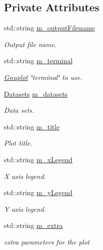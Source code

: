 \subsection*{Private Attributes}
\begin{DoxyCompactItemize}
\item 
std\+::string \hyperlink{classns3_1_1Gnuplot_aa22986d3af73e9b62a6eaadaf1b43763}{m\+\_\+output\+Filename}
\begin{DoxyCompactList}\small\item\em Output file name. \end{DoxyCompactList}\item 
std\+::string \hyperlink{classns3_1_1Gnuplot_a57041922a660f3a33e8f2f5f75ad9b83}{m\+\_\+terminal}
\begin{DoxyCompactList}\small\item\em \hyperlink{classns3_1_1Gnuplot}{Gnuplot} \char`\"{}terminal\char`\"{} to use. \end{DoxyCompactList}\item 
\hyperlink{classns3_1_1Gnuplot_a88609830a70d2fb1f1b8f2e8a70cd09d}{Datasets} \hyperlink{classns3_1_1Gnuplot_a67150d03c8735e79efa247e27ffd2ab5}{m\+\_\+datasets}
\begin{DoxyCompactList}\small\item\em Data sets. \end{DoxyCompactList}\item 
std\+::string \hyperlink{classns3_1_1Gnuplot_a7a600dbd860152df160e84b82026ffda}{m\+\_\+title}
\begin{DoxyCompactList}\small\item\em Plot title. \end{DoxyCompactList}\item 
std\+::string \hyperlink{classns3_1_1Gnuplot_a98f4044a69ababcd17550375e487bdb6}{m\+\_\+x\+Legend}
\begin{DoxyCompactList}\small\item\em X axis legend. \end{DoxyCompactList}\item 
std\+::string \hyperlink{classns3_1_1Gnuplot_a2de2eaa271e443b018df1928b19bd707}{m\+\_\+y\+Legend}
\begin{DoxyCompactList}\small\item\em Y axis legend. \end{DoxyCompactList}\item 
std\+::string \hyperlink{classns3_1_1Gnuplot_a5b88505b31c6b6aeb22f042f6119ac8b}{m\+\_\+extra}
\begin{DoxyCompactList}\small\item\em extra parameters for the plot \end{DoxyCompactList}\item 

\end{DoxyCompactItemize}
